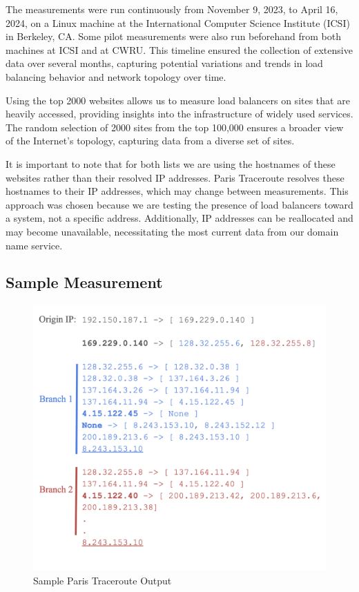 \documentclass[12pt]{cwru_thesis}
\begin{document}
The measurements were run continuously from November 9, 2023, to April 16, 2024, on a Linux machine at the International Computer Science Institute (ICSI) in Berkeley, CA. Some pilot measurements were also run beforehand from both machines at ICSI and at CWRU.
This timeline ensured the collection of extensive data over several months, capturing potential variations and trends in load balancing behavior and network topology over time. 

Using the top 2000 websites allows us to measure load balancers on sites that are heavily accessed, providing insights into the infrastructure of widely used services. The random selection of 2000 sites from the top 100,000 ensures a broader view of the Internet's topology, capturing data from a diverse set of sites.

It is important to note that for both lists we are using the hostnames of these websites rather than their resolved IP addresses. Paris Traceroute resolves these hostnames to their IP addresses, which may change between measurements. This approach was chosen because we are testing the presence of load balancers toward a system, not a specific address. Additionally, IP addresses can be reallocated and may become unavailable, necessitating the most current data from our domain name service.


\subsection{Sample Measurement}
\begin{figure}[H]
    \centering
    \includegraphics[width=\linewidth]{figures/sample.png}
    \caption{Sample Paris Traceroute Output}
    \label{fig:sample}
\end{figure}
\end{document}
